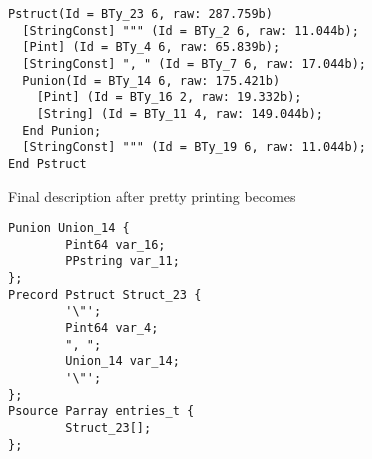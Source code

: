 \documentclass{sig-alternate-sigmod08}
\begin{document}
{\small
\begin{verbatim}
Pstruct(Id = BTy_23 6, raw: 287.759b)
  [StringConst] """ (Id = BTy_2 6, raw: 11.044b);
  [Pint] (Id = BTy_4 6, raw: 65.839b);
  [StringConst] ", " (Id = BTy_7 6, raw: 17.044b);
  Punion(Id = BTy_14 6, raw: 175.421b)
    [Pint] (Id = BTy_16 2, raw: 19.332b);
    [String] (Id = BTy_11 4, raw: 149.044b);
  End Punion;
  [StringConst] """ (Id = BTy_19 6, raw: 11.044b);
End Pstruct
\end{verbatim}
}

Final \pads{} description after pretty printing
becomes
{\small
\begin{verbatim}
Punion Union_14 {
        Pint64 var_16;
        PPstring var_11;
};
Precord Pstruct Struct_23 {
        '\"';
        Pint64 var_4;
        ", ";
        Union_14 var_14;
        '\"';
};
Psource Parray entries_t {
        Struct_23[];
};
\end{verbatim}
}

%
%
%



\end{document}
